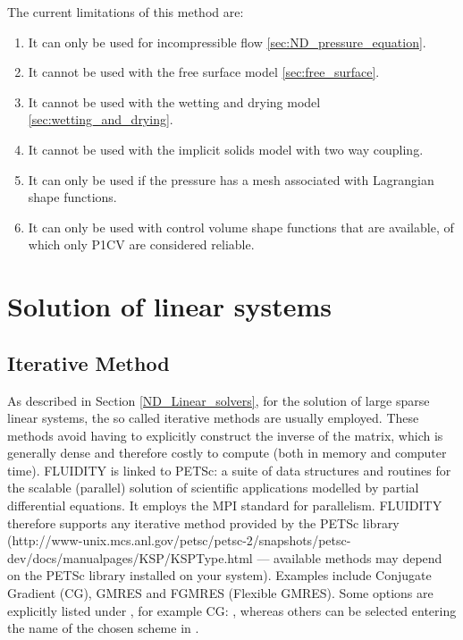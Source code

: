 The current limitations of this method are:
\begin{enumerate}
  \item It can only be used for incompressible flow \ref{sec:ND_pressure_equation}.
  \item It cannot be used with the free surface model \ref{sec:free_surface}.
  \item It cannot be used with the wetting and drying model \ref{sec:wetting_and_drying}.
  \item It cannot be used with the implicit solids model with two way coupling.
  \item It can only be used if the pressure has a mesh associated with Lagrangian shape functions.
  \item It can only be used with control volume shape functions that are available, of which only P1CV are considered reliable. 
\end{enumerate}

\section{Solution of linear systems}\label{sec:Solve}

\subsection{Iterative Method}
As described in Section \ref{ND_Linear_solvers}, for the solution of large sparse linear systems, the so called iterative methods are usually employed. These methods avoid having to explicitly construct the inverse of the matrix, which is generally dense and therefore costly to compute (both in memory and computer time). FLUIDITY is linked to PETSc: a suite of data structures and routines for the scalable (parallel) solution of scientific applications modelled by partial differential equations.  It employs the MPI standard for parallelism. FLUIDITY therefore supports any iterative method provided by the PETSc library (http://www-unix.mcs.anl.gov/petsc/petsc-2/snapshots/petsc-dev/docs/manualpages/KSP/KSPType.html --- available methods may depend on the PETSc library installed on your system). Examples include Conjugate Gradient (CG), GMRES and FGMRES (Flexible GMRES). Some options are explicitly listed under , for example CG: , whereas 
others can be selected entering the name of the chosen scheme in .

